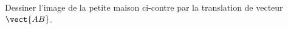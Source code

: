 
\begin{exercice}\label{exosmath-0053}

    \begin{multicols}{2}
        Dessiner l'image de la petite maison ci-contre par la translation de vecteur \( \vect{AB}\).

        \columnbreak
        
    \end{multicols}

\end{exercice}
